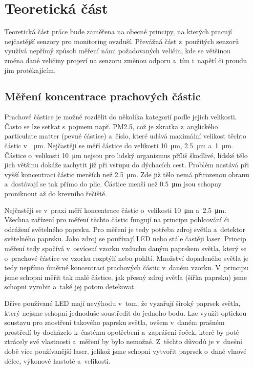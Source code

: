 \chapter{Teoretická část}

Teoretická část práce bude zaměřena na obecné principy, na kterých pracují nejčastější senzory pro monitoring ovzduší. Převážná část z~použitých senzorů využívá nepřímý způsob měření námi požadovaných veličin, kde se většinou změna dané veličiny projeví na senzoru změnou odporu a~tím i~napětí či proudu jím protékajícím.

\section{Měření koncentrace prachových částic}

Prachové částice je možné rozdělit do několika kategorií podle jejich velikosti. Často se lze setkat s~pojmem např. PM2.5, což je zkratka z~anglického particulate matter (pevné částice) a~číslo, které udává maximální velikost těchto částic v~\SI{}{\micro\metre}. Nejčastěji se měří částice do velikosti \SI{10}{\micro\metre}, \SI{2,5}{\micro\metre} a~\SI{1}{\micro\metre}. Částice o~velikosti \SI{10}{\micro\metre} nejsou pro lidský organismus příliš škodlivé, lidské tělo jich většinu dokáže zachytit již při vstupu do dýchacích cest. Problém nastává při vyšší koncentraci částic menších než \SI{2,5}{\micro\metre}. Zde již tělo nemá přirozenou obranu a~dostávají se tak přímo do plic. Částice menší než \SI{0,5}{\micro\metre} jsou schopny proniknout až do krevního řečiště.

Nejčastěji se v~praxi měří koncentrace částic o~velikosti \SI{10}{\micro\metre} a~\SI{2,5}{\micro\metre}. Všechna zařízení pro měření těchto částic fungují na principu pohlcování či odrážení světelného paprsku. Pro měření je tedy potřeba zdroj světla a~detektor světelného paprsku. Jako zdroj se používají LED nebo stále častěji laser. Princip měření tedy spočívá v~osvícení vzorku vzduchu daným paprskem světla, který se o~prachové částice ve vzorku rozptýlí nebo pohltí. Množství dopadeného světla je tedy nepřímo úměrné koncentraci prachových částic v~daném vzorku. V~principu jsme schopni měřit tak malé částice, jak přesný zdroj světla (šířka paprsku) jsme schopni vyrobit a~také jej potom detekovat.

Dříve používané LED mají nevýhodu v~tom, že vyzařují široký paprsek světla, který nejsme schopni jednoduše soustředit do jednoho bodu. Lze využít optickou soustavu pro zaostření takového paprsku světla, ovšem v~daném prašném prostředí by docházelo k~častému opotřebení a~zaprášení čoček, které by poté ztrácely své vlastnosti a~měření by bylo nemožné. Z~těchto důvodů je v~dnešní době více používanější laser, jelikož jsme schopni vytvořit paprsek o~dané vlnové délce, výkonové hustotě a~velikosti. 

